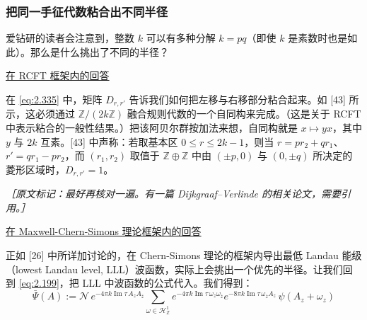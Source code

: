 \subsubsection{把同一手征代数粘合出不同半径} %

爱钻研的读者会注意到，整数 $k$ 可以有多种分解 $k=pq$（即使 $k$ 是素数时也是如此）。那么是什么挑出了不同的半径？

\underline{在 RCFT 框架内的回答}

在 \eqref{eq:2.335} 中，矩阵 $D_{r,r'}$ 告诉我们如何把左移与右移部分粘合起来。如 [43] 所示，这必须通过 $\mathbb{Z}/(2k\mathbb{Z})$ 融合规则代数的一个自同构来完成。（这是关于 RCFT 中表示粘合的一般性结果。）把该阿贝尔群按加法来想，自同构就是 $x\mapsto yx$，其中 $y$ 与 $2k$ 互素。[43] 中声称：若取基本区 $0\le r\le 2k-1$，则当 $r=pr_2+qr_1$、$r'=qr_1-pr_2$，而 $(r_1,r_2)$ 取值于 $\mathbb{Z}\oplus\mathbb{Z}$ 中由 $(\pm p,0)$ 与 $(0,\pm q)$ 所决定的菱形区域时，$D_{r,r'}=1$。

{\small\itshape ［原文标记：最好再核对一遍。有一篇 Dijkgraaf–Verlinde 的相关论文，需要引用。］}

\underline{在 Maxwell-Chern-Simons 理论框架内的回答}

正如 [26] 中所详加讨论的，在 Chern-Simons 理论的框架内导出最低 Landau 能级（lowest Landau level, LLL）波函数，实际上会挑出一个优先的半径。让我们回到 \eqref{eq:2.199}，把 LLL 中波函数的公式代入。我们得到：
\begin{equation}
  \bar\Psi(A) := \mathcal{N}\,e^{-4\pi k\operatorname{Im}\tau\,A_zA_{\bar z}}
  \sum_{\omega\in\mathcal{H}^1_{\mathbb{Z}}}
  e^{-4\pi k\operatorname{Im}\tau\,\omega_z\omega_{\bar z}}
  e^{-8\pi k\operatorname{Im}\tau\,\omega_{\bar z}A_z}
  \,\psi(A_z+\omega_z)
  \tag{2.336}
  \label{eq:2.336}
\end{equation}

